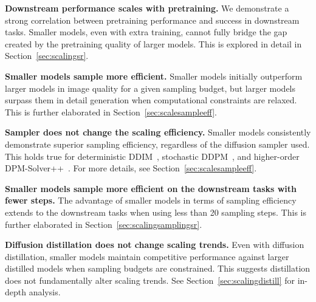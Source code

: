 \noindent \textbf{Downstream performance scales with pretraining.}
We demonstrate a strong correlation between pretraining performance and success in downstream tasks. Smaller models, even with extra training, cannot fully bridge the gap created by the pretraining quality of larger models. 
%
This is explored in detail in Section~\ref{sec:scalingsr}.

\noindent \textbf{Smaller models sample more efficient.} 
Smaller models initially outperform larger models in image quality for a given sampling budget, but larger models surpass them in detail generation when computational constraints are relaxed. %
%
This is further elaborated in Section~\ref{sec:scalesampleeff}.

\noindent \textbf{Sampler does not change the scaling efficiency.}
Smaller models consistently demonstrate superior sampling efficiency, regardless of the diffusion sampler used. This holds true for deterministic DDIM~\cite{song2020denoising}, stochastic DDPM~\cite{ho2020denoising}, and higher-order DPM-Solver++~\cite{lu2022dpm2}. For more details, see Section~\ref{sec:scalesampleeff}.

\noindent \textbf{Smaller models sample more efficient on the downstream tasks with fewer steps.}
The advantage of smaller models in terms of sampling efficiency extends to the downstream tasks when using less than 20 sampling steps.
This is further elaborated in Section~\ref{sec:scalingsamplingsr}.

\noindent \textbf{Diffusion distillation does not change scaling trends.}
Even with diffusion distillation, smaller models maintain competitive performance against larger distilled models when sampling budgets are constrained. This suggests distillation does not fundamentally alter scaling trends. See Section~\ref{sec:scalingdistill} for in-depth analysis.


